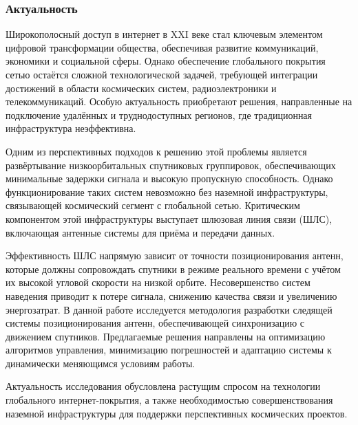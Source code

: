 \subsubsection{Актуальность} 

Широкополосный доступ в интернет в XXI веке стал ключевым элементом цифровой трансформации общества, 
обеспечивая развитие коммуникаций, экономики и социальной сферы. Однако обеспечение глобального покрытия сетью 
остаётся сложной технологической задачей, требующей интеграции достижений в области космических систем, радиоэлектроники 
и телекоммуникаций. Особую актуальность приобретают решения, направленные на подключение удалённых и труднодоступных регионов, 
где традиционная инфраструктура неэффективна.

Одним из перспективных подходов к решению этой проблемы является развёртывание низкоорбитальных спутниковых группировок, 
обеспечивающих минимальные задержки сигнала и высокую пропускную способность. Однако функционирование таких систем невозможно без наземной инфраструктуры, 
связывающей космический сегмент с глобальной сетью. Критическим компонентом этой инфраструктуры выступает шлюзовая линия связи (ШЛС), 
включающая антенные системы для приёма и передачи данных.

Эффективность ШЛС напрямую зависит от точности позиционирования антенн, которые должны сопровождать спутники в режиме реального времени 
с учётом их высокой угловой скорости на низкой орбите. Несовершенство систем наведения приводит к потере сигнала, 
снижению качества связи и увеличению энергозатрат. В данной работе исследуется методология разработки следящей системы 
позиционирования антенн, обеспечивающей синхронизацию с движением спутников. Предлагаемые решения направлены на оптимизацию алгоритмов управления, 
минимизацию погрешностей и адаптацию системы к динамически меняющимся условиям работы.

Актуальность исследования обусловлена растущим спросом на технологии глобального интернет-покрытия, 
а также необходимостью совершенствования наземной инфраструктуры для поддержки перспективных космических проектов. 

